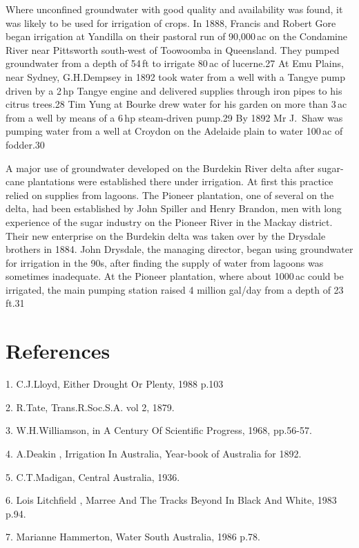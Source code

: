 Where unconfined groundwater with good quality and availability was
found, it was likely to be used for irrigation of crops.  In 1888,
Francis and Robert Gore began irrigation at Yandilla on their pastoral
run of 90,000\,ac on the Condamine River near Pittsworth south-west of
Toowoomba in Queensland.  They pumped groundwater from a depth of
54\,ft to irrigate 80\,ac of lucerne.27 At Emu Plains, near Sydney,
G.H.Dempsey in 1892 took water from a well with a Tangye pump driven
by a 2\,hp Tangye engine and delivered supplies through iron pipes to
his citrus trees.28 Tim Yung at Bourke drew water for his garden on
more than 3\,ac from a well by means of a 6\,hp steam-driven pump.29
By 1892 Mr J.~Shaw was pumping water from a well at Croydon on the
Adelaide plain to water 100\,ac of fodder.30

A major use of groundwater developed on the Burdekin River delta after
sugar-cane plantations were established there under irrigation.  At
first this practice relied on supplies from lagoons.  The Pioneer
plantation, one of several on the delta, had been established by John
Spiller and Henry Brandon, men with long experience of the sugar
industry on the Pioneer River in the Mackay district.  Their new
enterprise on the Burdekin delta was taken over by the Drysdale
brothers in 1884.  John Drysdale, the managing director, began using
groundwater for irrigation in the 90s, after finding the supply of
water from lagoons was sometimes inadequate.  At the Pioneer
plantation, where about 1000\,ac could be irrigated, the main pumping
station raised 4 million gal/day from a depth of 23\,ft.31

\section{References}

1. C.J.Lloyd, Either Drought Or Plenty, 1988 p.103

2. R.Tate, Trans.R.Soc.S.A. vol 2, 1879. 

3. W.H.Williamson, in A Century Of Scientific Progress, 1968, pp.56-57.

4. A.Deakin , Irrigation In Australia, Year-book of Australia for 1892.

5. C.T.Madigan, Central Australia, 1936.

6.  Lois Litchfield , Marree And The Tracks Beyond In Black And White, 1983
      p.94. 

7.  Marianne Hammerton, Water South Australia, 1986 p.78.

